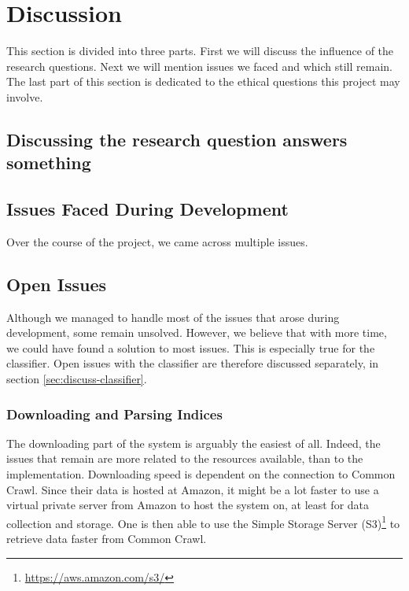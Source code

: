 \chapter{Discussion}\label{sec:discussion}

This section is divided into three parts. First we will discuss the influence of the research questions. Next we will mention issues we faced and which still remain. The last part of this section is dedicated to the ethical questions this project may involve.

\section{Discussing the research question answers something} 

\section{Issues Faced During Development}
Over the course of the project, we came across multiple issues. 
    


\section{Open Issues}\label{sec:Discussion - Open Issues}
Although we managed to handle most of the issues that arose during development, some remain unsolved. However, we believe that with more time, we could have found a solution to most issues. This is especially true for the classifier. Open issues with the classifier are therefore discussed separately, in section \ref{sec:discuss-classifier}.

\subsection{Downloading and Parsing Indices}
The downloading part of the system is arguably the easiest of all. Indeed, the issues that remain are more related to the resources available, than to the implementation. Downloading speed is dependent on the connection to Common Crawl. Since their data is hosted at Amazon, it might be a lot faster to use a virtual private server from Amazon to host the system on, at least for data collection and storage. One is then able to use the Simple Storage Server (S3)\footnote{\url{https://aws.amazon.com/s3/}} to retrieve data faster from Common Crawl.

